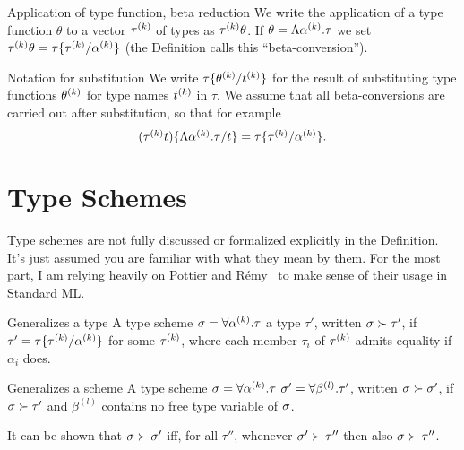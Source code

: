 \begin{clause}{Application of type function, beta reduction}
We write the application of a type function $\theta$ to a vector
$\mbox{$\tau^{(k)}$}$ of types as $\mbox{$\tau^{(k)}$}\theta$.
If $\theta=\Lambda\mbox{$\alpha^{(k)}$}.\tau$ we set $\mbox{$\tau^{(k)}$}\theta=\tau\{\mbox{$\tau^{(k)}$}/\mbox{$\alpha^{(k)}$}\}$
(the Definition calls this ``beta-conversion''). 
\end{clause}

\begin{convention}{Notation for substitution}
We write $\tau\{\mbox{$\theta^{(k)}$}/\mbox{$t^{(k)}$}\}$ for the result of substituting type
functions $\mbox{$\theta^{(k)}$}$ for type names $\mbox{$t^{(k)}$}$ in $\tau$.
We assume that all beta-conversions
are carried out after substitution, so that for example
\begin{equation*}
(\mbox{$\tau^{(k)}$}t)\{\Lambda\mbox{$\alpha^{(k)}$}.\tau/t\}=\tau\{\mbox{$\tau^{(k)}$}/\mbox{$\alpha^{(k)}$}\}.
\end{equation*}
\end{convention}

\section{Type Schemes}

\begin{ddanger}
Type schemes are not fully discussed or formalized explicitly in the
Definition. It's just assumed you are familiar with what they mean by
them. For the most part, I am relying heavily on Pottier and
R{\'e}my~\cite{pottier2005essence} to make sense of their usage in
Standard ML.
\end{ddanger}

\begin{definition}{Generalizes a type}
A type scheme $\sigma=\forall\mbox{$\alpha^{(k)}$}.\tau$  a type
$\tau'$, written $\sigma \succ\tau'$, if $\tau'=\tau\{\mbox{$\tau^{(k)}$}/\mbox{$\alpha^{(k)}$}\}$
for some $\mbox{$\tau^{(k)}$}$, where each member $\tau_i$ of $\mbox{$\tau^{(k)}$}$ admits equality
if $\alpha_i$ does.
\end{definition}

\begin{definition}{Generalizes a scheme}
A type scheme $\sigma=\forall\mbox{$\alpha^{(k)}$}.\tau$  $\sigma'=\forall\beta^{(l)}.\tau'$,
written $\sigma\succ\sigma'$, if $\sigma\succ\tau'$ and $\beta^{(l)}$ contains
no free type variable of $\sigma$.

It can be shown that $\sigma\succ\sigma'$ iff, for all $\tau''$, whenever
$\sigma'\succ\tau''$ then also $\sigma\succ\tau''$.
\end{definition}

